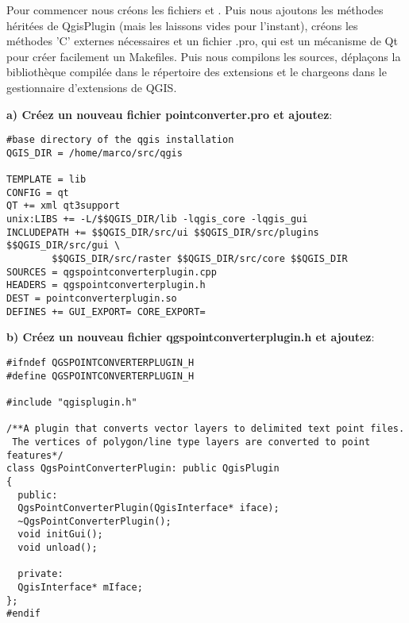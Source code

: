 
Pour commencer nous cr\'eons les fichiers  et 
. Puis nous ajoutons les m\'ethodes h\'erit\'ees de 
QgisPlugin (mais les laissons vides pour l'instant), cr\'eons les m\'ethodes 'C' 
externes n\'ecessaires et un fichier .pro, qui est un m\'ecanisme de Qt pour cr\'eer 
facilement un Makefiles. Puis nous compilons les sources, d\'epla\c{c}ons la 
biblioth\`eque compil\'ee dans le r\'epertoire des extensions et le chargeons dans le 
gestionnaire d'extensions de QGIS.

\textbf{a) Cr\'eez un nouveau fichier pointconverter.pro et ajoutez}:

\begin{verbatim}
#base directory of the qgis installation
QGIS_DIR = /home/marco/src/qgis

TEMPLATE = lib
CONFIG = qt
QT += xml qt3support
unix:LIBS += -L/$$QGIS_DIR/lib -lqgis_core -lqgis_gui
INCLUDEPATH += $$QGIS_DIR/src/ui $$QGIS_DIR/src/plugins  $$QGIS_DIR/src/gui \
        $$QGIS_DIR/src/raster $$QGIS_DIR/src/core $$QGIS_DIR 
SOURCES = qgspointconverterplugin.cpp
HEADERS = qgspointconverterplugin.h
DEST = pointconverterplugin.so
DEFINES += GUI_EXPORT= CORE_EXPORT=
\end{verbatim}

\textbf{b) Cr\'eez un nouveau fichier qgspointconverterplugin.h et ajoutez}:

\begin{verbatim}
#ifndef QGSPOINTCONVERTERPLUGIN_H
#define QGSPOINTCONVERTERPLUGIN_H

#include "qgisplugin.h"

/**A plugin that converts vector layers to delimited text point files.
 The vertices of polygon/line type layers are converted to point features*/
class QgsPointConverterPlugin: public QgisPlugin
{
  public:
  QgsPointConverterPlugin(QgisInterface* iface);
  ~QgsPointConverterPlugin();
  void initGui();
  void unload();
  
  private:
  QgisInterface* mIface;
};
#endif
\end{verbatim}

